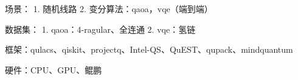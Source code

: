 场景：
1. 随机线路
2. 变分算法：qaoa，vqe（端到端）

数据集：
1. qaoa：4-ragular、全连通
2. vqe：氢链

框架：qulacs、qiskit、projectq、Intel-QS、QuEST、qupack、mindquantum

硬件：CPU、GPU、鲲鹏